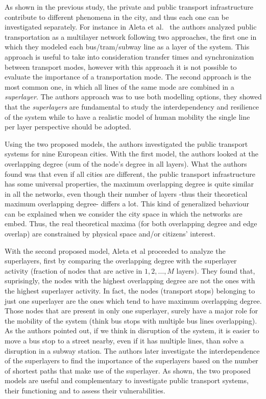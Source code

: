 As shown in the previous study, the private and public transport infrastructure contribute to different phenomena in the city, and thus each one can be investigated separately. For instance in Aleta et al.~\cite{Aleta2017Multilayer} the authors analyzed public transportation as a multilayer network following two approaches, the first one in which they modeled each bus/tram/subway line as a layer of the system. This approach is useful to take into consideration transfer times and synchronization between transport modes, however with this approach it is not possible to evaluate the importance of a transportation mode. The second approach is the most common one, in which all lines of the same mode are combined in a \textit{superlayer}. The authors approach was to use both modelling options, they showed that the \textit{superlayers} are fundamental to study the interdependency and resilience of the system while to have a realistic model of human mobility the single line per layer perspective should be adopted.

Using the two proposed models, the authors investigated the public transport systems for nine European cities. With the first model, the authors looked at the overlapping degree (sum of the node's degree in all layers). What the authors found was that even if all cities are different, the public transport infrastructure has some universal properties, the maximum overlapping degree is quite similar in all the networks, even though their number of layers -thus their theoretical maximum overlapping degree- differs a lot. This kind of generalized behaviour can be explained when we consider the city space in which the networks are embed. Thus, the real theoretical maxima (for both overlapping degree and edge overlap) are constrained by physical space and/or citizens' interest.

With the second proposed model, Aleta et al \cite{aleta2017transportation} proceeded to analyze the superlayers, first by comparing the overlapping degree with the superlayer activity (fraction of nodes that are active in $1, 2, \dots, M$ layers). They found that, suprisingly, the nodes with the highest overlapping degree are not the ones with the highest superlayer activity. In fact, the nodes (transport stops) belonging to just one superlayer are the ones which tend to have maximum overlapping degree. Those nodes that are present in only one superlayer, surely have a major role for the mobility of the system (think bus stops with multiple bus lines overlapping). As the authors pointed out, if we think in disruption of the system, it is easier to move a bus stop to a street nearby, even if it has multiple lines, than solve a disruption in a subway station. The authors later investigate the interdependence of the superlayers to find the importance of the superlayers based on the number of shortest paths that make use of the superlayer. As shown, the two proposed models are useful and complementary to investigate public transport systems, their functioning and to assess their vulnerabilities. 

